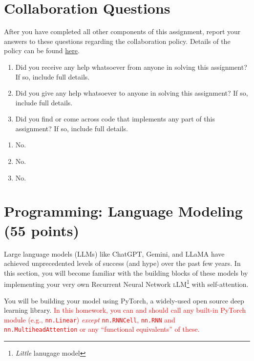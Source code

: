 \documentclass[11pt,addpoints,answers]{exam}
\begin{document}
\section{Collaboration Questions}
After you have completed all other components of this assignment, report your answers to these questions regarding the collaboration policy. Details of the policy can be found \href{http://www.cs.cmu.edu/~mgormley/courses/10601/syllabus.html}{here}.
\begin{enumerate}
    \item Did you receive any help whatsoever from anyone in solving this assignment? If so, include full details.
    \item Did you give any help whatsoever to anyone in solving this assignment? If so, include full details.
    \item Did you find or come across code that implements any part of this assignment? If so, include full details.
\end{enumerate}

\begin{your_solution}[height=6cm]
\begin{enumerate}
    \item No.
	\item No.
	\item No.
\end{enumerate}	
\end{your_solution}

\newpage
\section{Programming: Language Modeling (55 points)}
\label{programming}

Large language models (LLMs) like ChatGPT, Gemini, and LLaMA have achieved unprecedented levels of success (and hype) over the past few years. In this section, you will become familiar with the building blocks of these models by implementing your very own Recurrent Neural Network \textsc{l}LM\footnote{\textit{Little} lanugage model} with self-attention.

You will be building your model using PyTorch, a widely-used open source deep learning library. \textcolor{red}{In this homework, you can and should call any built-in PyTorch module (e.g., \texttt{nn.Linear}) \textit{except} \texttt{nn.RNNCell}, \texttt{nn.RNN} and \texttt{nn.MultiheadAttention} or any “functional equivalents” of these.}
\end{document}
